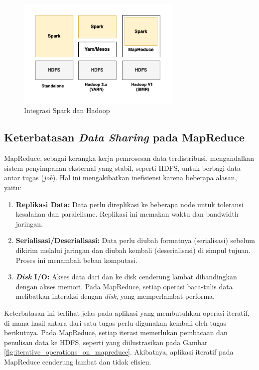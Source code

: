 \begin{figure}[h!]
    \centering
    \includegraphics[width=0.7\textwidth]{figures/ch02/sparkxhadoop}
    \caption{Integrasi Spark dan Hadoop}
    \label{fig:spark-x-hadoop}
\end{figure}

\subsection{Keterbatasan \textit{Data Sharing} pada MapReduce}

MapReduce, sebagai kerangka kerja pemrosesan data terdistribusi, mengandalkan sistem penyimpanan eksternal yang stabil, seperti HDFS, untuk berbagi data antar tugas (\textit{job}). Hal ini mengakibatkan inefisiensi karena beberapa alasan, yaitu:

\begin{enumerate}
    \item \textbf{Replikasi Data:} Data perlu direplikasi ke beberapa node untuk toleransi kesalahan dan paralelisme. Replikasi ini memakan waktu dan bandwidth jaringan.
    \item \textbf{Serialisasi/Deserialisasi:} Data perlu diubah formatnya (serialisasi) sebelum dikirim melalui jaringan dan diubah kembali (deserialisasi) di simpul tujuan. Proses ini menambah beban komputasi.
    \item \textbf{\textit{Disk} I/O:} Akses data dari dan ke disk cenderung lambat dibandingkan dengan akses memori. Pada MapReduce, setiap operasi baca-tulis data melibatkan interaksi dengan \textit{disk}, yang memperlambat performa.
\end{enumerate}

Keterbatasan ini terlihat jelas pada aplikasi yang membutuhkan operasi iteratif, di mana hasil antara dari satu tugas perlu digunakan kembali oleh tugas berikutnya. Pada MapReduce, setiap iterasi memerlukan pembacaan dan penulisan data ke HDFS, seperti yang diilustrasikan pada Gambar \ref{fig:iterative_operations_on_mapreduce}. Akibatnya, aplikasi iteratif pada MapReduce cenderung lambat dan tidak efisien.

